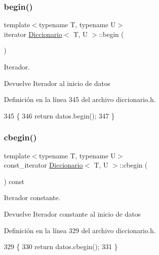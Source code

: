 \subsubsection{\texorpdfstring{begin()}{begin()}}
{\footnotesize\ttfamily template$<$typename T, typename U$>$ \\
iterator \hyperlink{classDiccionario}{Diccionario}$<$ T, U $>$\+::begin (\begin{DoxyParamCaption}{ }\end{DoxyParamCaption})\hspace{0.3cm}{\ttfamily [inline]}}



Iterador. 

\begin{DoxyReturn}{Devuelve}
Iterador al inicio de datos 
\end{DoxyReturn}


Definición en la línea 345 del archivo diccionario.\+h.


\begin{DoxyCode}
345                      \{
346         \textcolor{keywordflow}{return} datos.begin();
347     \}
\end{DoxyCode}
\mbox{\label{classDiccionario_a8d18a8044a6c1a1482762fd84ab37017}} 
\subsubsection{\texorpdfstring{cbegin()}{cbegin()}}
{\footnotesize\ttfamily template$<$typename T, typename U$>$ \\
const\+\_\+iterator \hyperlink{classDiccionario}{Diccionario}$<$ T, U $>$\+::cbegin (\begin{DoxyParamCaption}{ }\end{DoxyParamCaption}) const\hspace{0.3cm}{\ttfamily [inline]}}



Iterador constante. 

\begin{DoxyReturn}{Devuelve}
Iterador constante al inicio de datos 
\end{DoxyReturn}


Definición en la línea 329 del archivo diccionario.\+h.


\begin{DoxyCode}
329                                   \{
330         \textcolor{keywordflow}{return} datos.cbegin();
331     \}
\end{DoxyCode}
\mbox{\label{classDiccionario_ac4e5b5c7800bf3df103ca6b58f118598}} 

